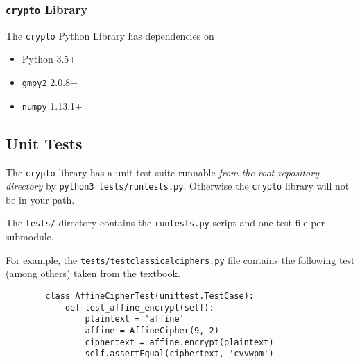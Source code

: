     \subsubsection{\texttt{crypto} Library}
        The \texttt{crypto} Python Library has dependencies on
        \begin{itemize}
            \item Python 3.5+
            \item \texttt{gmpy2} 2.0.8+
            \item \texttt{numpy} 1.13.1+
        \end{itemize}

\subsection{Unit Tests}
    The \texttt{crypto} library has a unit test suite runnable {\em from the root repository directory\/} by \texttt{python3 tests/runtests.py}. Otherwise the \texttt{crypto} library will not be in your path.

    The \texttt{tests/} directory contains the \texttt{runtests.py} script and one test file per submodule.

    For example, the \texttt{tests/test\textunderscore{}classical\textunderscore{}ciphers.py} file contains the following test (among others) taken from the textbook.

    \begin{verbatim}
        class AffineCipherTest(unittest.TestCase):
            def test_affine_encrypt(self):
                plaintext = 'affine'
                affine = AffineCipher(9, 2)
                ciphertext = affine.encrypt(plaintext)
                self.assertEqual(ciphertext, 'cvvwpm')
    \end{verbatim}
